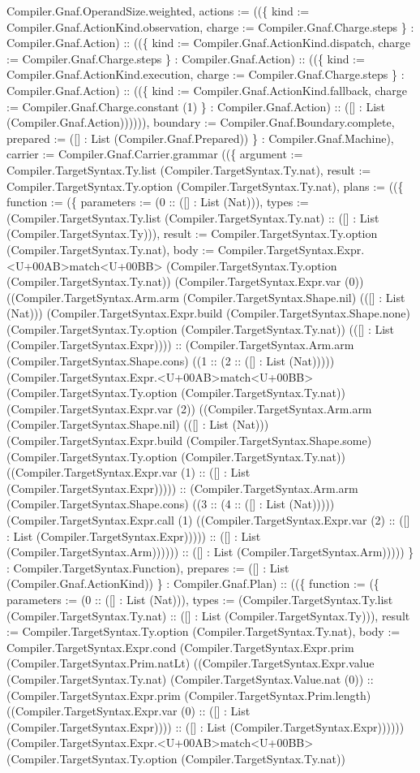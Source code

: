 \documentclass[11pt]{article}
\begin{document}
Compiler.Gnaf.OperandSize.weighted, actions := ((\{ kind := Compiler.Gnaf.ActionKind.observation, charge := Compiler.Gnaf.Charge.steps \} : Compiler.Gnaf.Action) :: ((\{ kind := Compiler.Gnaf.ActionKind.dispatch, charge := Compiler.Gnaf.Charge.steps \} : Compiler.Gnaf.Action) :: ((\{ kind := Compiler.Gnaf.ActionKind.execution, charge := Compiler.Gnaf.Charge.steps \} : Compiler.Gnaf.Action) :: ((\{ kind := Compiler.Gnaf.ActionKind.fallback, charge := Compiler.Gnaf.Charge.constant (1) \} : Compiler.Gnaf.Action) :: ([] : List (Compiler.Gnaf.Action)))))), boundary := Compiler.Gnaf.Boundary.complete, prepared := ([] : List (Compiler.Gnaf.Prepared)) \} : Compiler.Gnaf.Machine), carrier := Compiler.Gnaf.Carrier.grammar ((\{ argument := Compiler.TargetSyntax.Ty.list (Compiler.TargetSyntax.Ty.nat), result := Compiler.TargetSyntax.Ty.option (Compiler.TargetSyntax.Ty.nat), plans := ((\{ function := (\{ parameters := (0 :: ([] : List (Nat))), types := (Compiler.TargetSyntax.Ty.list (Compiler.TargetSyntax.Ty.nat) :: ([] : List (Compiler.TargetSyntax.Ty))), result := Compiler.TargetSyntax.Ty.option (Compiler.TargetSyntax.Ty.nat), body := Compiler.TargetSyntax.Expr.<U+00AB>match<U+00BB> (Compiler.TargetSyntax.Ty.option (Compiler.TargetSyntax.Ty.nat)) (Compiler.TargetSyntax.Expr.var (0)) ((Compiler.TargetSyntax.Arm.arm (Compiler.TargetSyntax.Shape.nil) (([] : List (Nat))) (Compiler.TargetSyntax.Expr.build (Compiler.TargetSyntax.Shape.none) (Compiler.TargetSyntax.Ty.option (Compiler.TargetSyntax.Ty.nat)) (([] : List (Compiler.TargetSyntax.Expr)))) :: (Compiler.TargetSyntax.Arm.arm (Compiler.TargetSyntax.Shape.cons) ((1 :: (2 :: ([] : List (Nat))))) (Compiler.TargetSyntax.Expr.<U+00AB>match<U+00BB> (Compiler.TargetSyntax.Ty.option (Compiler.TargetSyntax.Ty.nat)) (Compiler.TargetSyntax.Expr.var (2)) ((Compiler.TargetSyntax.Arm.arm (Compiler.TargetSyntax.Shape.nil) (([] : List (Nat))) (Compiler.TargetSyntax.Expr.build (Compiler.TargetSyntax.Shape.some) (Compiler.TargetSyntax.Ty.option (Compiler.TargetSyntax.Ty.nat)) ((Compiler.TargetSyntax.Expr.var (1) :: ([] : List (Compiler.TargetSyntax.Expr))))) :: (Compiler.TargetSyntax.Arm.arm (Compiler.TargetSyntax.Shape.cons) ((3 :: (4 :: ([] : List (Nat))))) (Compiler.TargetSyntax.Expr.call (1) ((Compiler.TargetSyntax.Expr.var (2) :: ([] : List (Compiler.TargetSyntax.Expr))))) :: ([] : List (Compiler.TargetSyntax.Arm)))))) :: ([] : List (Compiler.TargetSyntax.Arm))))) \} : Compiler.TargetSyntax.Function), prepares := ([] : List (Compiler.Gnaf.ActionKind)) \} : Compiler.Gnaf.Plan) :: ((\{ function := (\{ parameters := (0 :: ([] : List (Nat))), types := (Compiler.TargetSyntax.Ty.list (Compiler.TargetSyntax.Ty.nat) :: ([] : List (Compiler.TargetSyntax.Ty))), result := Compiler.TargetSyntax.Ty.option (Compiler.TargetSyntax.Ty.nat), body := Compiler.TargetSyntax.Expr.cond (Compiler.TargetSyntax.Expr.prim (Compiler.TargetSyntax.Prim.natLt) ((Compiler.TargetSyntax.Expr.value (Compiler.TargetSyntax.Ty.nat) (Compiler.TargetSyntax.Value.nat (0)) :: (Compiler.TargetSyntax.Expr.prim (Compiler.TargetSyntax.Prim.length) ((Compiler.TargetSyntax.Expr.var (0) :: ([] : List (Compiler.TargetSyntax.Expr)))) :: ([] : List (Compiler.TargetSyntax.Expr)))))) (Compiler.TargetSyntax.Expr.<U+00AB>match<U+00BB> (Compiler.TargetSyntax.Ty.option (Compiler.TargetSyntax.Ty.nat)) 
\end{document}
